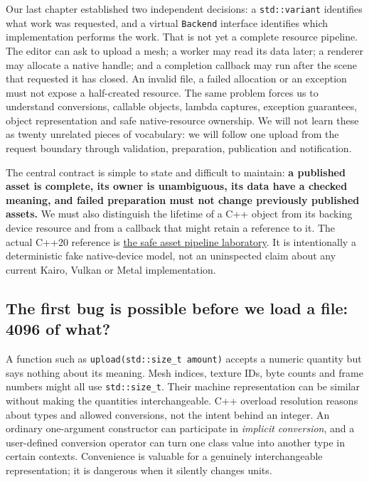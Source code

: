 Our last chapter established two independent decisions: a \texttt{std::variant} identifies what work was requested, and a virtual \texttt{Backend} interface identifies which implementation performs the work. That is not yet a complete resource pipeline. The editor can ask to upload a mesh; a worker may read its data later; a renderer may allocate a native handle; and a completion callback may run after the scene that requested it has closed. An invalid file, a failed allocation or an exception must not expose a half-created resource. The same problem forces us to understand conversions, callable objects, lambda captures, exception guarantees, object representation and safe native-resource ownership. We will not learn these as twenty unrelated pieces of vocabulary: we will follow one upload from the request boundary through validation, preparation, publication and notification.

The central contract is simple to state and difficult to maintain: \textbf{a published asset is complete, its owner is unambiguous, its data have a checked meaning, and failed preparation must not change previously published assets.} We must also distinguish the lifetime of a C++ object from its backing device resource and from a callback that might retain a reference to it. The actual C++20 reference is \hyperref[source-file-32e93bc026677e074aaa7771]{the safe asset pipeline laboratory}. It is intentionally a deterministic fake native-device model, not an uninspected claim about any current Kairo, Vulkan or Metal implementation.

\subsection{The first bug is possible before we load a file: 4096 of what?}\label{05-engine-i-ch004-the-first-bug-is-possible-before-we-load-a-file-4096-of-what}

\hypertarget{05-engine-i-ch004-the-first-bug-is-possible-before-we-load-a-file-4096-of-what}{}

A function such as \texttt{upload(std::size\_t\ amount)} accepts a numeric quantity but says nothing about its meaning. Mesh indices, texture IDs, byte counts and frame numbers might all use \texttt{std::size\_t}. Their machine representation can be similar without making the quantities interchangeable. C++ overload resolution reasons about types and allowed conversions, not the intent behind an integer. An ordinary one-argument constructor can participate in \emph{implicit conversion}, and a user-defined conversion operator can turn one class value into another type in certain contexts. Convenience is valuable for a genuinely interchangeable representation; it is dangerous when it silently changes units.

